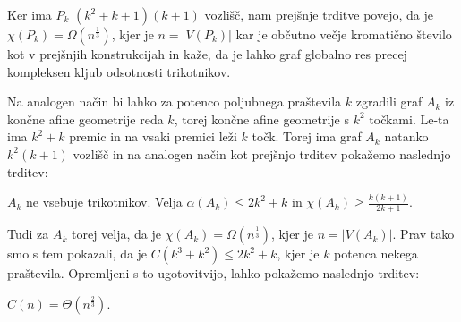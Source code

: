 \documentclass[mat1, tisk]{fmfdelo}
\begin{document}
Ker ima $P_k$ $(k^2 + k + 1)(k + 1)$ vozlišč, nam prejšnje trditve povejo, da je $\chi(P_k) = \Omega(n^{\frac{1}{3}})$, kjer je $n = |V(P_k)|$ kar je občutno večje kromatično število kot v prejšnjih konstrukcijah in kaže, da je lahko graf globalno res precej kompleksen
kljub odsotnosti trikotnikov.

Na analogen način bi lahko za potenco poljubnega praštevila $k$ zgradili graf $A_k$ iz končne afine geometrije reda $k$, torej končne afine geometrije s $k^2$ točkami. Le-ta ima $k^2 + k$ premic in na vsaki premici leži $k$ točk. Torej ima graf $A_k$ natanko $k^2(k + 1)$ vozlišč in na analogen način kot prejšnjo
trditev pokažemo naslednjo trditev:

    \begin{trditev}
        $A_k$ ne vsebuje trikotnikov. Velja $\alpha(A_k) \leq 2 k^2 + k$ in $\chi(A_k) \geq \frac{k(k + 1)}{2k + 1}$.
    \end{trditev}

Tudi za $A_k$ torej velja, da je $\chi(A_k) = \Omega(n^{\frac{1}{3}})$, kjer je $n = |V(A_k)|$. Prav tako smo s tem pokazali, da je $C(k^3 + k^2) \leq 2k^2 + k$, kjer je $k$ potenca nekega praštevila. Opremljeni s to ugotovitvijo, lahko pokažemo naslednjo trditev:

    \begin{trditev}
        $C(n) = \Theta(n^{\frac{2}{3}})$.
    \end{trditev}
\end{document}
